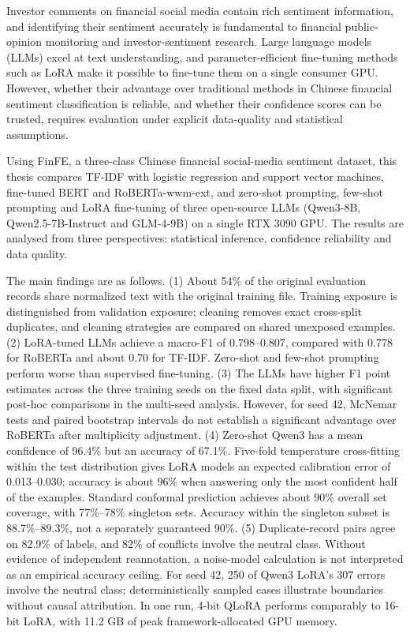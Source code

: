 Investor comments on financial social media contain rich sentiment information, and identifying their sentiment accurately is fundamental to financial public-opinion monitoring and investor-sentiment research. Large language models (LLMs) excel at text understanding, and parameter-efficient fine-tuning methods such as LoRA make it possible to fine-tune them on a single consumer GPU. However, whether their advantage over traditional methods in Chinese financial sentiment classification is reliable, and whether their confidence scores can be trusted, requires evaluation under explicit data-quality and statistical assumptions.

Using FinFE, a three-class Chinese financial social-media sentiment dataset, this thesis compares TF-IDF with logistic regression and support vector machines, fine-tuned BERT and RoBERTa-wwm-ext, and zero-shot prompting, few-shot prompting and LoRA fine-tuning of three open-source LLMs (Qwen3-8B, Qwen2.5-7B-Instruct and GLM-4-9B) on a single RTX 3090 GPU. The results are analysed from three perspectives: statistical inference, confidence reliability and data quality.

The main findings are as follows. (1) About 54\% of the original evaluation records share normalized text with the original training file. Training exposure is distinguished from validation exposure; cleaning removes exact cross-split duplicates, and cleaning strategies are compared on shared unexposed examples. (2) LoRA-tuned LLMs achieve a macro-F1 of 0.798--0.807, compared with 0.778 for RoBERTa and about 0.70 for TF-IDF. Zero-shot and few-shot prompting perform worse than supervised fine-tuning. (3) The LLMs have higher F1 point estimates across the three training seeds on the fixed data split, with significant post-hoc comparisons in the multi-seed analysis. However, for seed 42, McNemar tests and paired bootstrap intervals do not establish a significant advantage over RoBERTa after multiplicity adjustment. (4) Zero-shot Qwen3 has a mean confidence of 96.4\% but an accuracy of 67.1\%. Five-fold temperature cross-fitting within the test distribution gives LoRA models an expected calibration error of 0.013--0.030; accuracy is about 96\% when answering only the most confident half of the examples. Standard conformal prediction achieves about 90\% overall set coverage, with 77\%--78\% singleton sets. Accuracy within the singleton subset is 88.7\%--89.3\%, not a separately guaranteed 90\%. (5) Duplicate-record pairs agree on 82.9\% of labels, and 82\% of conflicts involve the neutral class. Without evidence of independent reannotation, a noise-model calculation is not interpreted as an empirical accuracy ceiling. For seed 42, 250 of Qwen3 LoRA's 307 errors involve the neutral class; deterministically sampled cases illustrate boundaries without causal attribution. In one run, 4-bit QLoRA performs comparably to 16-bit LoRA, with 11.2 GB of peak framework-allocated GPU memory.

